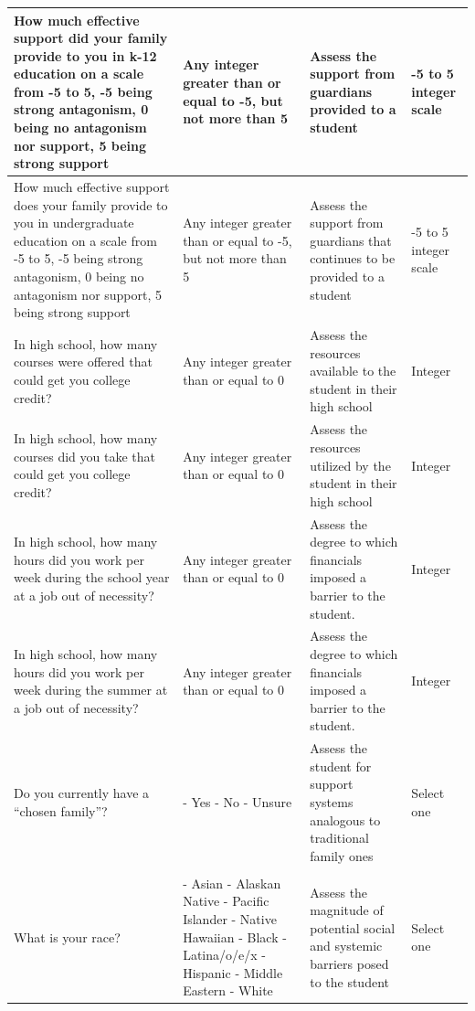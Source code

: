 \documentclass[10pt, twocolumn]{article}
\begin{document}
\begin{xltabular}{\textwidth}{|p{0.3\textwidth}|p{0.3\textwidth}|p{0.2\textwidth}|X|}
    How much effective support did your family provide to you in k-12 education on a scale from -5 to 5, -5 being strong antagonism, 0 being no antagonism nor support, 5 being strong support & Any integer greater than or equal to -5, but not more than 5 & Assess the support from guardians provided to a student & -5 to 5 integer scale \\ \hline 
    How much effective support does your family provide to you in undergraduate education on a scale from -5 to 5, -5 being strong antagonism, 0 being no antagonism nor support, 5 being strong support & Any integer greater than or equal to -5, but not more than 5 & Assess the support from guardians that continues to be provided to a student & -5 to 5 integer scale \\ \hline 
    In high school, how many courses were offered that could get you college credit? & Any integer greater than or equal to 0 & Assess the resources available to the student in their high school & Integer \\ \hline 
    In high school, how many courses did you take that could get you college credit? & Any integer greater than or equal to 0 & Assess the resources utilized by the student in their high school & Integer \\ \hline 
    In high school, how many hours did you work per week during the school year at a job out of necessity? & Any integer greater than or equal to 0 & Assess the degree to which financials imposed a barrier to the student. & Integer \\ \hline 
    In high school, how many hours did you work per week during the summer at a job out of necessity? & Any integer greater than or equal to 0 & Assess the degree to which financials imposed a barrier to the student. & Integer \\ \hline
    Do you currently have a ``chosen family''? & - Yes \newline - No \newline - Unsure & Assess the student for support systems analogous to traditional family ones & Select one \\ 
    \hline 
     \\ \hline
    What is your race? & - Asian \newline - Alaskan Native \newline - Pacific Islander \newline - Native Hawaiian \newline - Black \newline - Latina/o/e/x \newline - Hispanic \newline - Middle Eastern \newline - White & Assess the magnitude of potential social and systemic barriers posed to the student & Select one \\ \hline 

\end{xltabular}
\end{document}
